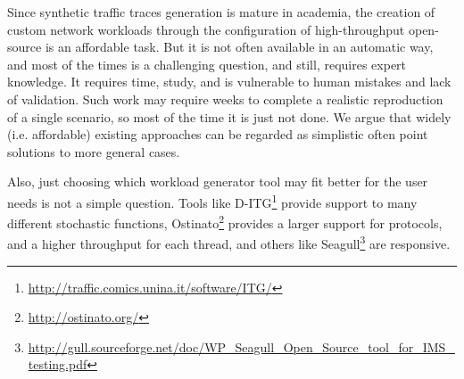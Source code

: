 Since synthetic traffic traces generation is mature in academia, the creation of custom network workloads through the configuration of high-throughput open-source is an affordable task. But it is not often available in an automatic way, and most of the times is a challenging question\cite{legotg-paper}, and still, requires expert knowledge. It requires time, study, and is vulnerable to human mistakes and lack of validation. Such work may require weeks to complete a realistic reproduction of a single scenario, so most of the time it is just not done. We argue that widely (i.e. affordable) existing approaches can be regarded as simplistic often point solutions to more general cases. 


Also, just choosing which workload generator tool may fit better for the user needs is not a simple question. Tools like D-ITG\footnote{\href{http://traffic.comics.unina.it/software/ITG/}{http://traffic.comics.unina.it/software/ITG/}} provide support to many different stochastic functions, Ostinato\footnote{\href{http://ostinato.org/}{http://ostinato.org/}} provides a larger support for protocols, and a higher throughput for each thread\cite{comparative-trafficgen-tools}, and others like Seagull\footnote{\href{http://gull.sourceforge.net/doc/WP_Seagull_Open_Source_tool_for_IMS_testing.pdf}{http://gull.sourceforge.net/doc/WP\_Seagull\_Open\_Source\_tool\_for\_IMS\_testing.pdf}} are responsive. 













